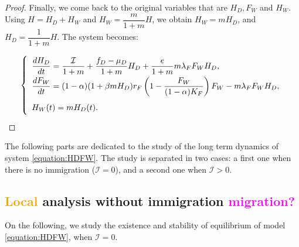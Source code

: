 \documentclass{article}
\newcommand{\lfw}{\lambda_{F}}
\newcommand{\lfw}{\lambda_{F}}
\newcommand{\cI}{\mathcal{I}}
\newcommand{\YD}[1]{\textcolor{magenta}{#1}}
\newcommand{\vdeux}[1]{\textcolor{orange}{#1}}
\theoremstyle{definition}
\theoremstyle{remark}
\begin{document}
\begin{proof}
\medskip
Finally, we come back to the original variables that are $H_D, F_W$ and $H_W$. Using $H = H_D + H_W$ and $H_W = \dfrac{m}{1+m}H$, we obtain $H_W = m H_D$, and $H_D = \dfrac{1}{1+m}	H$. The system becomes:

\begin{equation*}
\def\arraystretch{2}
\left\lbrace \begin{array}{l}
\dfrac{dH_D}{dt} = \dfrac{\cI}{1+m} + \dfrac{f_D - \mu_D}{1+m} H_D + \dfrac{e}{1+m} m \lfw F_W H_D, \\
\dfrac{dF_W}{dt} = (1-\alpha) (1+\beta m H_D) r_F \left(1 - \dfrac{F_W}{(1-\alpha)K_F} \right) F_W - m \lfw F_WH_D, \\
H_W(t) = m H_D(t).
\end{array} \right.
\end{equation*}

\end{proof}

%

The following parts are dedicated to the study of the long term dynamics of system \eqref{equation:HDFW}. The study is separated in two cases: a first one when there is no immigration ($\cI = 0$), and a second one when $\cI > 0$.

\subsection{\vdeux{Local} analysis without immigration \YD{migration?}}

On the following, we study the existence and stability of equilibrium of model \eqref{equation:HDFW}, when $\cI = 0$.
\end{document}

